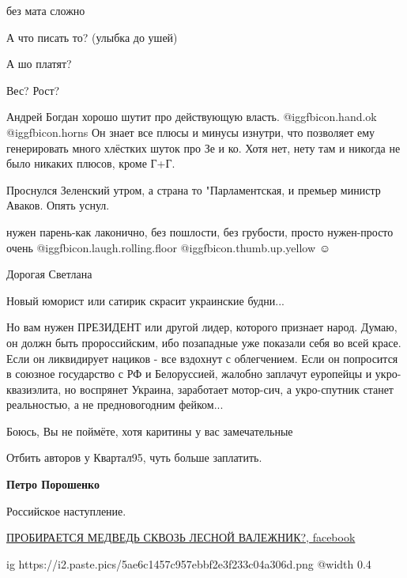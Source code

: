 \begin{itemize}
без мата сложно

А что писать то? (улыбка до ушей)


А шо платят?


Вес? Рост?


Андрей Богдан хорошо шутит про действующую власть. @igg{fbicon.hand.ok}  @igg{fbicon.horns} 
Он знает все плюсы и минусы изнутри, что позволяет ему генерировать много хлёстких шуток про Зе и ко.
Хотя нет, нету там и никогда не было никаких плюсов, кроме Г+Г.


Проснулся Зеленский утром, а страна то "Парламентская, и премьер министр
Аваков. Опять уснул.


нужен парень-как лаконично, без пошлости, без грубости, просто нужен-просто
очень @igg{fbicon.laugh.rolling.floor}  @igg{fbicon.thumb.up.yellow} ☺


Дорогая Светлана

Новый юморист или сатирик скрасит украинские будни...

Но вам нужен ПРЕЗИДЕНТ или другой лидер, которого признает народ. Думаю, он
должн быть пророссийским, ибо позападные уже показали себя во всей красе. Если
он ликвидирует нациков - все вздохнут с облегчением. Если он попросится в
союзное государство с РФ и Белоруссией, жалобно заплачут еуропейцы и
укро-квазиэлита, но воспрянет Украина, заработает мотор-сич, а укро-спутник
станет реальностью, а не предновогодним фейком...

Боюсь, Вы не поймёте, хотя каритины у вас замечательные

Отбить авторов у Квартал95, чуть больше заплатить.

\textbf{Петро Порошенко}


Российское наступление.

\href{https://www.facebook.com/sergio.motorriery/posts/439213217833912}{%
ПРОБИРАЕТСЯ МЕДВЕДЬ СКВОЗЬ ЛЕСНОЙ ВАЛЕЖНИК?, facebook}

\ifcmt
  ig https://i2.paste.pics/5ae6c1457c957ebbf2e3f233c04a306d.png
  @width 0.4
\fi


\end{itemize}
